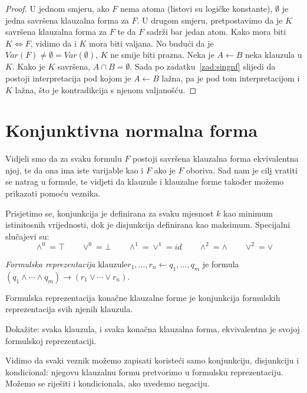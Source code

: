 \begin{proof}
U jednom smjeru, ako $F$ nema atoma (listovi su logičke konstante), $\emptyset$ je jedna savršena klauzalna forma za $F$. U drugom smjeru,
pretpostavimo da je $K$ savršena klauzalna forma za $F$ te da $F$ sadrži bar jedan atom. Kako mora biti $K\Leftrightarrow F$, vidimo da i $K$ mora biti valjana. No budući da je $Var(F)\not=\emptyset=Var(\emptyset)$, $K$ ne smije biti prazna. Neka je $A\leftarrow B$ neka klauzula u $K$. Kako je $K$ savršena, $A\cap B=\emptyset$. Sada po zadatku~\ref{zad:singnf} slijedi da postoji interpretacija pod kojom je $A\leftarrow B$ lažna, pa je pod tom interpretacijom i $K$ lažna, što je kontradikcija s njenom valjanošću.
\end{proof}

\section{Konjunktivna normalna forma}

Vidjeli smo da za svaku formulu $F$ postoji savršena klauzalna forma ekvivalentna njoj, te da ona ima iste varijable kao i $F$ ako je $F$ oboriva. Sad nam je cilj vratiti se natrag u formule, te vidjeti da klauzule i klauzalne forme također možemo prikazati pomoću veznika.

Prisjetimo se, konjunkcija je definirana za svaku mjesnost $k$ kao minimum istinitosnih vrijednosti, dok je disjunkcija definirana kao maksimum. Specijalni slučajevi su:
$$\wedge^0=\top\qquad\vee^0=\bot\qquad\wedge^1=\vee^1=id\qquad\wedge^2=\wedge\qquad\vee^2=\vee$$

\begin{definicija}
\emph{Formulska reprezentacija} klauzule\newline $r_1,\ldots,r_n\leftarrow q_1,\ldots,q_m$ je formula $(q_1\wedge\cdots\wedge q_m)\to(r_1\vee\cdots\vee r_n)$.

Formulska reprezentacija konačne klauzalne forme je konjunkcija formulskih reprezentacija svih njenih klauzula.
\end{definicija}

\begin{zadatak}\label{zad:clfeqfr}
Dokažite: svaka klauzula, i svaka konačna klauzalna forma, ekvivalentna je svojoj formulskoj reprezentaciji.
\end{zadatak}

Vidimo da svaki veznik možemo zapisati koristeći samo konjunkciju, disjunkciju i kondicional: njegovu klauzalnu formu pretvorimo u formulsku reprezentaciju. Možemo se riješiti i kondicionala, ako uvedemo negaciju.

